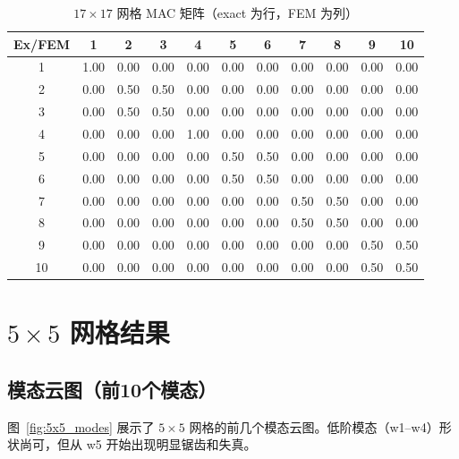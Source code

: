\documentclass[12pt,a4paper]{article}
\begin{document}
\begin{table}[htbp]
\centering
\caption{$17\times17$ 网格 MAC 矩阵（exact 为行，FEM 为列）}
\label{tab:mac_17}
\begin{tabular}{ccccccccccc}
\toprule
Ex/FEM & 1 & 2 & 3 & 4 & 5 & 6 & 7 & 8 & 9 & 10\\
\midrule
1 & \cellcolor{yellow!30}1.00 & 0.00 & 0.00 & 0.00 & 0.00 & 0.00 & 0.00 & 0.00 & 0.00 & 0.00\\
2 & 0.00 & \cellcolor{yellow!30}0.50 & \cellcolor{yellow!30}0.50 & 0.00 & 0.00 & 0.00 & 0.00 & 0.00 & 0.00 & 0.00\\
3 & 0.00 & \cellcolor{yellow!30}0.50 & \cellcolor{yellow!30}0.50 & 0.00 & 0.00 & 0.00 & 0.00 & 0.00 & 0.00 & 0.00\\
4 & 0.00 & 0.00 & 0.00 & \cellcolor{yellow!30}1.00 & 0.00 & 0.00 & 0.00 & 0.00 & 0.00 & 0.00\\
5 & 0.00 & 0.00 & 0.00 & 0.00 & \cellcolor{yellow!30}0.50 & \cellcolor{yellow!30}0.50 & 0.00 & 0.00 & 0.00 & 0.00\\
6 & 0.00 & 0.00 & 0.00 & 0.00 & \cellcolor{yellow!30}0.50 & \cellcolor{yellow!30}0.50 & 0.00 & 0.00 & 0.00 & 0.00\\
7 & 0.00 & 0.00 & 0.00 & 0.00 & 0.00 & 0.00 & \cellcolor{yellow!30}0.50 & \cellcolor{yellow!30}0.50 & 0.00 & 0.00\\
8 & 0.00 & 0.00 & 0.00 & 0.00 & 0.00 & 0.00 & \cellcolor{yellow!30}0.50 & \cellcolor{yellow!30}0.50 & 0.00 & 0.00\\
9 & 0.00 & 0.00 & 0.00 & 0.00 & 0.00 & 0.00 & 0.00 & 0.00 & \cellcolor{yellow!30}0.50 & \cellcolor{yellow!30}0.50\\
10& 0.00 & 0.00 & 0.00 & 0.00 & 0.00 & 0.00 & 0.00 & 0.00 & \cellcolor{yellow!30}0.50 & \cellcolor{yellow!30}0.50\\
\bottomrule
\end{tabular}
\end{table}

\clearpage
\section{$5\times5$ 网格结果}

\subsection{模态云图（前10个模态）}
图~\ref{fig:5x5_modes} 展示了 $5\times5$ 网格的前几个模态云图。低阶模态（w1–w4）形状尚可，但从 w5 开始出现明显锯齿和失真。
\end{document}
